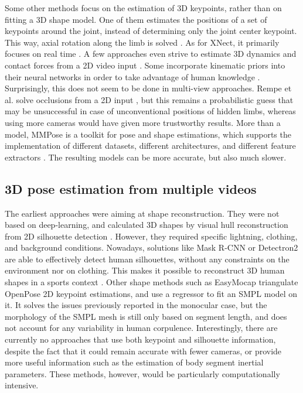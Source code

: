 Some other methods focus on the estimation of 3D keypoints, rather than on fitting a 3D shape model. One of them estimates the positions of a set of keypoints around the joint, instead of determining only the joint center keypoint. This way, axial rotation along the limb is solved \cite{Fisch2020}. As for XNect, it primarily focuses on real time \cite{Mehta2020}. A few approaches even strive to estimate 3D dynamics and contact forces from a 2D video input \cite{Li2019,Rempe2021,Louis2022}. Some incorporate kinematic priors into their neural networks in order to take advantage of human knowledge \cite{Xu2020a}. Surprisingly, this does not seem to be done in multi-view approaches. Rempe et al. solve occlusions from a 2D input \cite{Rempe2020}, but this remains a probabilistic guess that may be unsuccessful in case of unconventional positions of hidden limbs, whereas using more cameras would have given more trustworthy results. More than a model, MMPose is a toolkit for pose and shape estimations, which supports the implementation of different datasets, different architectures, and different feature extractors \cite{MMPose2020}. The resulting models can be more accurate, but also much slower.


\subsection{3D pose estimation from multiple videos}

The earliest approaches were aiming at shape reconstruction. They were not based on deep-learning, and calculated 3D shapes by visual hull reconstruction from 2D silhouette detection \cite{Cheung2003,Corazza2006}. However, they required specific lightning, clothing, and background conditions. Nowadays, solutions like Mask R-CNN \cite{He2017} or Detectron2 \cite{Wu2019} are able to effectively detect human silhouettes, without any constraints on the environment nor on clothing. This makes it possible to reconstruct 3D human shapes in a sports context \cite{Chen2019}. Other shape methods such as EasyMocap \cite{Easymocap2021} triangulate OpenPose 2D keypoint estimations, and use a regressor to fit an SMPL model on it. It solves the issues previously reported in the monocular case, but the morphology of the SMPL mesh is still only based on segment length, and does not account for any variability in human corpulence. Interestingly, there are currently no approaches that use both keypoint and silhouette information, despite the fact that it could remain accurate with fewer cameras, or provide more useful information such as the estimation of body segment inertial parameters. These methods, however, would be particularly computationally intensive.

